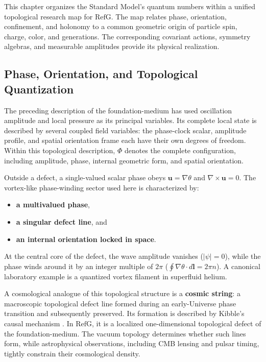 \documentclass[11pt,a4paper]{article}
\newcommand{\RefG}{\mathrm{RefG}}
\begin{document}
This chapter organizes the Standard Model's quantum numbers within a unified topological research map for $\RefG$. The map relates phase, orientation, confinement, and holonomy to a common geometric origin of particle spin, charge, color, and generations. The corresponding covariant actions, symmetry algebras, and measurable amplitudes provide its physical realization.

\subsection{Phase, Orientation, and Topological Quantization}

The preceding description of the foundation-medium has used oscillation amplitude and local pressure as its principal variables. Its complete local state is described by several coupled field variables: the phase-clock scalar, amplitude profile, and spatial orientation frame each have their own degrees of freedom. Within this topological description, $\Phi$ denotes the complete configuration, including amplitude, phase, internal geometric form, and spatial orientation.

Outside a defect, a single-valued scalar phase obeys $\mathbf{u}=\nabla\theta$ and $\nabla\times\mathbf{u}=0$. The vortex-like phase-winding sector used here is characterized by:
\begin{itemize}
\item \textbf{a multivalued phase},
\item \textbf{a singular defect line}, and
\item \textbf{an internal orientation locked in space}.
\end{itemize}

At the central core of the defect, the wave amplitude vanishes ($|\psi|=0$), while the phase winds around it by an integer multiple of $2\pi$ ($\oint \nabla\theta\cdot d\mathbf{l}=2\pi n$). A canonical laboratory example is a quantized vortex filament in superfluid helium.

A cosmological analogue of this topological structure is a \textbf{cosmic string}: a macroscopic topological defect line formed during an early-Universe phase transition and subsequently preserved. Its formation is described by Kibble's causal mechanism \citep{kibble1976}. In $\RefG$, it is a localized one-dimensional topological defect of the foundation-medium. The vacuum topology determines whether such lines form, while astrophysical observations, including CMB lensing and pulsar timing, tightly constrain their cosmological density.
\end{document}
